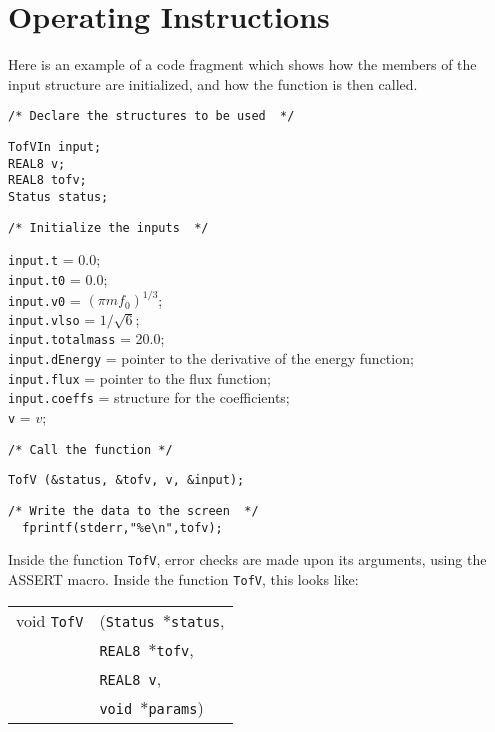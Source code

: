 \documentclass[12pt]{article}
\begin{document}
\section{Operating Instructions}

Here is an example of a code fragment which shows how the members of the input structure are initialized, and how the function is then called.

\vspace{5mm}

\noindent
\begin{verbatim}
/* Declare the structures to be used  */
\end{verbatim}
\texttt{TofVIn input;} \\
\texttt{REAL8 v;} \\
\texttt{REAL8 tofv;} \\
\texttt{Status status;} \\
\begin{verbatim}
/* Initialize the inputs  */
\end{verbatim}
\texttt{input.t} = 0.0; \\
\texttt{input.t0} = 0.0; \\
\texttt{input.v0} = $(\pi m f_{0})^{1/3}$; \\
\texttt{input.vlso} = $1/\sqrt{6}$; \\
\texttt{input.totalmass} = 20.0; \\
\texttt{input.dEnergy} = pointer to the derivative of the energy function; \\
\texttt{input.flux} = pointer to the flux function; \\
\texttt{input.coeffs} = structure for the coefficients; \\
\texttt{v} = $v$;
\begin{verbatim}
/* Call the function */
\end{verbatim}
\texttt{TofV (\&status, \&tofv, v, \&input);}
\begin{verbatim}
/* Write the data to the screen  */
  fprintf(stderr,"%e\n",tofv); 
\end{verbatim}

Inside the function \texttt{TofV}, error checks are made upon its arguments, using the ASSERT macro. Inside the function \texttt{TofV}, this looks like:

\vspace{5mm}

\begin{tabular}{ll}
void \texttt{TofV}&(\texttt{Status $\ast$status},     \\
                                   &\texttt{REAL8 $\ast$tofv}, \\
                                   &\texttt{REAL8 v}, \\
                                   &\texttt{void $\ast$params})
\end{tabular}
\end{document}
